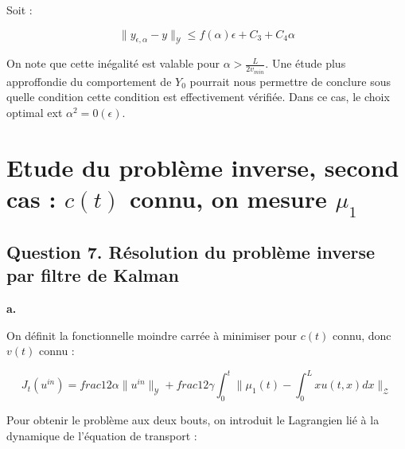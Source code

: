 \documentclass[a4paper]{article}
\newcommand{\Y}{\mathscr{Y}}
\newcommand{\Z}{\mathscr{Z}}
\newcommand{\yea}{y_{\epsilon, \alpha}}
\begin{document}
Soit :

\[ \| \yea - y \|_{\Y} \leq f(\alpha) \epsilon + C_3 +C_4 \alpha \]

On note que cette inégalité est valable pour $\alpha > \displaystyle \frac{L}{2 v_{min}}$.
Une étude plus approffondie du comportement de $Y_0$ pourrait nous permettre de conclure sous quelle condition cette condition est effectivement vérifiée.
Dans ce cas, le choix optimal ext $\alpha^2 = 0(\epsilon)$.



\section{Etude du problème inverse, second cas : $c(t)$ connu, on mesure $\mu_1$}

				
\subsection*{Question 7. Résolution du problème inverse par filtre de Kalman}
	
\textbf{a.}

On définit la fonctionnelle moindre carrée à minimiser pour $c(t)$ connu, donc $v(t)$ connu :

\[ J_t(u^{in}) = \displaystyle frac{1}{2}      
              \alpha \| u^{in} \|_{\Y} +  
			  \displaystyle frac{1}{2}      
			  \gamma \int_0^t \| \mu_1(t) - \int_0^L x u(t,x)dx \|_{\Z} \]

Pour obtenir le problème aux deux bouts, on introduit le Lagrangien lié à la dynamique de l'équation de transport :
\end{document}
